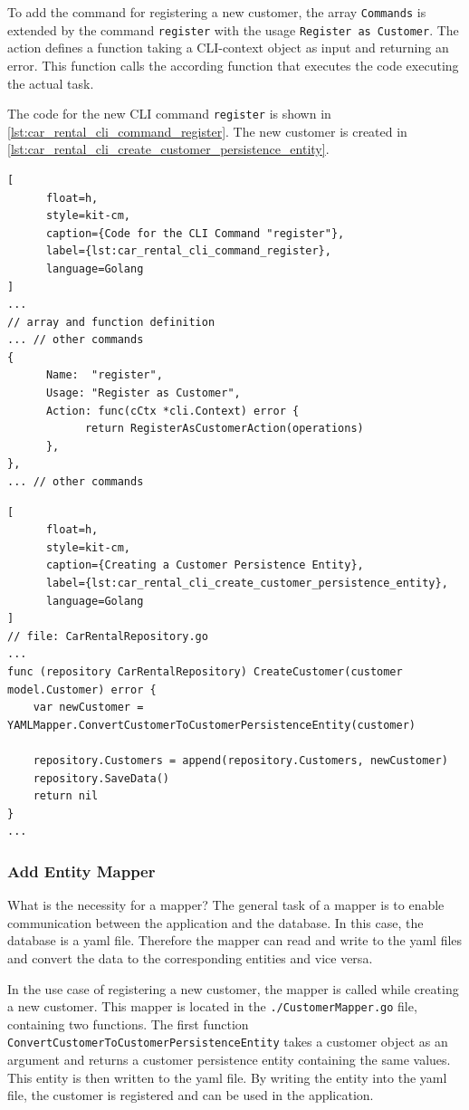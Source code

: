To add the command for registering a new customer, the array \texttt{Commands} is extended by the command \texttt{register} with the usage \texttt{Register as Customer}.
The action defines a function taking a CLI-context object as input and returning an error.
This function calls the according function that executes the code executing the actual task.

The code for the new CLI command \texttt{register} is shown in \autoref{lst:car_rental_cli_command_register}.
The new customer is created in \autoref{lst:car_rental_cli_create_customer_persistence_entity}.

\begin{lstlisting}[
      float=h,
      style=kit-cm,
      caption={Code for the CLI Command "register"},
      label={lst:car_rental_cli_command_register},
      language=Golang
]
...
// array and function definition
... // other commands
{
      Name:  "register",
      Usage: "Register as Customer",
      Action: func(cCtx *cli.Context) error {
            return RegisterAsCustomerAction(operations)
      },
},
... // other commands
\end{lstlisting}

\begin{lstlisting}[
      float=h,
      style=kit-cm,
      caption={Creating a Customer Persistence Entity},
      label={lst:car_rental_cli_create_customer_persistence_entity},
      language=Golang
]
// file: CarRentalRepository.go
...
func (repository CarRentalRepository) CreateCustomer(customer model.Customer) error {
	var newCustomer = YAMLMapper.ConvertCustomerToCustomerPersistenceEntity(customer)

	repository.Customers = append(repository.Customers, newCustomer)
	repository.SaveData()
	return nil
}
...
\end{lstlisting}

\subsubsection*{Add Entity Mapper}
What is the necessity for a mapper?
The general task of a mapper is to enable communication between the application and the database.
In this case, the database is a yaml file.
Therefore the mapper can read and write to the yaml files and convert the data to the corresponding entities and vice versa.

In the use case of registering a new customer, the mapper is called while creating a new customer.
This mapper is located in the \texttt{./CustomerMapper.go} file, containing two functions.
The first function \texttt{ConvertCustomerToCustomerPersistenceEntity} takes a customer object as an argument and returns a customer persistence entity containing the same values.
This entity is then written to the yaml file.
By writing the entity into the yaml file, the customer is registered and can be used in the application.

